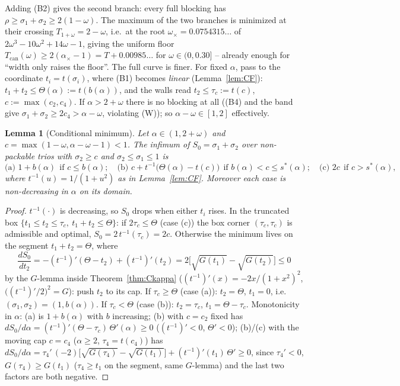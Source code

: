 \documentclass[11pt]{article}
\newtheorem{lemma}[theorem]{Lemma}
\theoremstyle{definition}
\begin{document}
Adding (B2) gives the second branch: every full blocking has
$\rho\ge\sigma_1+\sigma_2\ge2(1-\omega)$. The maximum of the two branches
is minimized at their crossing $T_{1+\omega}=2-\omega$, i.e.\ at the root
$\omega_\times=0.0754315\dots$ of $2\omega^3-10\omega^2+14\omega-1$, giving
the uniform floor
$T_{\mathrm{can}}(\omega)\ge2(\alpha_\times-1)=T+0.00985\dots$ for
$\omega\in(0,0.30]$ -- already enough for ``width only raises the floor''.
The full curve is finer. For fixed $\alpha$, pass to the coordinate
$t_i=t(\sigma_i)$, where (B1) becomes \emph{linear}
(Lemma~\ref{lem:CF}): $t_1+t_2\le\Theta(\alpha):=t(b(\alpha))$, and the
walls read $t_2\le\tau_c:=t(c)$, $c:=\max(c_2,c_4)$. If $\alpha>2+\omega$
there is no blocking at all ((B4) and the band give
$\sigma_1+\sigma_2\ge2c_4>\alpha-\omega$, violating (W)); so
$\alpha-\omega\in[1,2]$ effectively.

\begin{lemma}[Conditional minimum]\label{lem:CE1}
Let $\alpha\in(1,2+\omega)$ and $c=\max(1-\omega,\alpha-\omega-1)<1$. The
infimum of $S_0=\sigma_1+\sigma_2$ over non-packable trios with
$\sigma_2\ge c$ and $\sigma_2\le\sigma_1\le1$ is
\[
\text{(a) } 1+b(\alpha)\ \ \text{if } c\le b(\alpha);\quad
\text{(b) } c+t^{-1}\bigl(\Theta(\alpha)-t(c)\bigr)\ \ \text{if }
b(\alpha)<c\le s^*(\alpha);\quad
\text{(c) } 2c\ \ \text{if } c>s^*(\alpha),
\]
where $t^{-1}(u)=1/(1+u^2)$ as in Lemma~\ref{lem:CF}. Moreover each case
is non-decreasing in $\alpha$ on its domain.
\end{lemma}
\begin{proof}
$t^{-1}(\cdot)$ is decreasing, so $S_0$ drops when either $t_i$ rises. In
the truncated box $\{t_1\le t_2\le\tau_c,\ t_1+t_2\le\Theta\}$: if
$2\tau_c\le\Theta$ (case (c)) the box corner $(\tau_c,\tau_c)$ is admissible and
optimal, $S_0=2\,t^{-1}(\tau_c)=2c$. Otherwise the minimum lives on the segment
$t_1+t_2=\Theta$, where
\[
\frac{dS_0}{dt_2}=-(t^{-1})'(\Theta-t_2)+(t^{-1})'(t_2)
=2\bigl[\sqrt{G(t_1)}-\sqrt{G(t_2)}\bigr]\le0
\]
by the $G$-lemma inside Theorem~\ref{thm:Ckappa}
($(t^{-1})'(x)=-2x/(1+x^2)^2$, $\bigl((t^{-1})'/2\bigr)^2=G$): push $t_2$
to its cap.
If $\tau_c\ge\Theta$ (case (a)): $t_2=\Theta$, $t_1=0$, i.e.\
$(\sigma_1,\sigma_2)=(1,b(\alpha))$. If $\tau_c<\Theta$ (case (b)):
$t_2=\tau_c$, $t_1=\Theta-\tau_c$. Monotonicity in $\alpha$: (a) is
$1+b(\alpha)$ with $b$ increasing; (b) with $c=c_2$ fixed has
$dS_0/d\alpha=(t^{-1})'(\Theta-\tau_c)\,\Theta'(\alpha)\ge0$ ($(t^{-1})'<0$,
$\Theta'<0$); (b)/(c) with the moving cap $c=c_4$ ($\alpha\ge2$,
$\tau_4=t(c_4)$) has
$dS_0/d\alpha=\tau_4'\,(-2)\bigl[\sqrt{G(\tau_4)}-\sqrt{G(t_1)}\bigr]
+(t^{-1})'(t_1)\,\Theta'\ge0$, since $\tau_4'<0$, $G(\tau_4)\ge G(t_1)$
($\tau_4\ge t_1$ on the segment, same $G$-lemma) and the last two factors
are both negative.
\end{proof}
\end{document}
